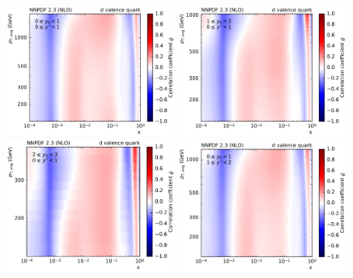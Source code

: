 \begin{figure}[htbp]
    \centering
    \includegraphics[width=0.49\textwidth]{figures/pdf_constraints/corr_PTMAXEXPYS_YBYS_NLO_FINALBINS_NNPDF23_d_valence_quark_ys0_0yb0_0_cl.pdf}\hfill
    \includegraphics[width=0.49\textwidth]{figures/pdf_constraints/corr_PTMAXEXPYS_YBYS_NLO_FINALBINS_NNPDF23_d_valence_quark_ys0_0yb1_0_cl.pdf}\hfill
    \includegraphics[width=0.49\textwidth]{figures/pdf_constraints/corr_PTMAXEXPYS_YBYS_NLO_FINALBINS_NNPDF23_d_valence_quark_ys0_0yb2_0_cl.pdf}\hfill
    \includegraphics[width=0.49\textwidth]{figures/pdf_constraints/corr_PTMAXEXPYS_YBYS_NLO_FINALBINS_NNPDF23_d_valence_quark_ys1_0yb0_0_cl.pdf}\hfill

\end{figure}
